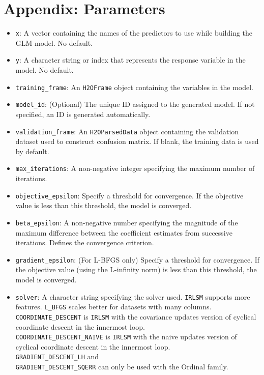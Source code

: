 \section{Appendix: Parameters}
\begin{itemize}
\item \texttt{x}: A vector containing the names of the predictors to use while building the GLM model. No default.
\item \texttt{y}: A character string or index that represents the response variable in the model. No default.
\item \texttt{training\_frame}: An \texttt{H2OFrame} object containing the variables in the model. 
\item \texttt{model\_id}: (Optional) The unique ID assigned to the generated model. If not specified, an ID is generated automatically.
\item \texttt{validation\_frame}: An \texttt{H2OParsedData} object containing the validation dataset used to construct confusion matrix. If  blank, the training data is used by default.
\item \texttt{max\_iterations}: A non-negative integer specifying the maximum number of iterations. 
\item \texttt{objective\_epsilon}: Specify a threshold for convergence. If the objective value is less than this threshold, the model is converged.
\item \texttt{beta\_epsilon}: A non-negative number specifying the magnitude of the maximum difference between the coefficient estimates from successive iterations. Defines the convergence criterion. 
\item \texttt{gradient\_epsilon}: (For L-BFGS only) Specify a threshold for convergence. If the objective value (using the L-infinity norm) is less than this threshold, the model is converged.
\item \texttt{solver}: A character string specifying the solver used. \texttt{IRLSM} supports more features. \texttt{L\_BFGS} scales better for datasets with many columns. \texttt{COORDINATE\_DESCENT} is \texttt{IRLSM} with the covariance updates version of cyclical coordinate descent in the innermost loop. \\ \texttt{COORDINATE\_DESCENT\_NAIVE} is \texttt{IRLSM} with the naive updates version of cyclical coordinate descent in the innermost loop. \\ \texttt{GRADIENT\_DESCENT\_LH} and \\\texttt{GRADIENT\_DESCENT\_SQERR} can only be used with the Ordinal family.

\end{itemize}
